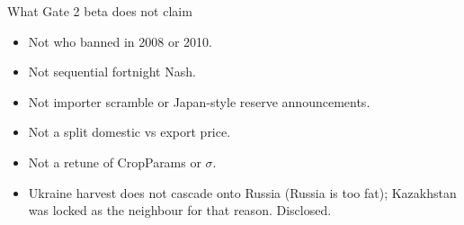 \begin{frame}{What Gate 2 beta does not claim}
\begin{itemize}
\item Not who banned in 2008 or 2010.
\item Not sequential fortnight Nash.
\item Not importer scramble or Japan-style reserve announcements.
\item Not a split domestic vs export price.
\item Not a retune of CropParams or $\sigma$.
\item Ukraine harvest does not cascade onto Russia (Russia is too fat);
      Kazakhstan was locked as the neighbour for that reason. Disclosed.
\end{itemize}
\end{frame}
